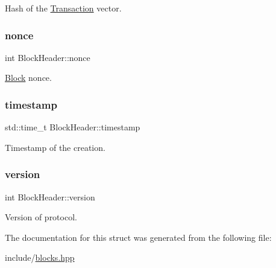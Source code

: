 Hash of the \mbox{\hyperlink{classTransaction}{Transaction}} vector. 

\mbox{\label{structBlockHeader_ad6a79d57f2ca6045c2940ce4af58f879}} 
\subsubsection{\texorpdfstring{nonce}{nonce}}
{\footnotesize\ttfamily int Block\+Header\+::nonce}



\mbox{\hyperlink{classBlock}{Block}} nonce. 

\mbox{\label{structBlockHeader_a4776495703f378b1af78ac6ad7aaca34}} 
\subsubsection{\texorpdfstring{timestamp}{timestamp}}
{\footnotesize\ttfamily std\+::time\+\_\+t Block\+Header\+::timestamp}



Timestamp of the creation. 

\mbox{\label{structBlockHeader_a0df73a2de060f5cabeffb4ae97500c75}} 
\subsubsection{\texorpdfstring{version}{version}}
{\footnotesize\ttfamily int Block\+Header\+::version}



Version of protocol. 



The documentation for this struct was generated from the following file\+:\begin{DoxyCompactItemize}
\item 
include/\mbox{\hyperlink{blocks_8hpp}{blocks.\+hpp}}\end{DoxyCompactItemize}
